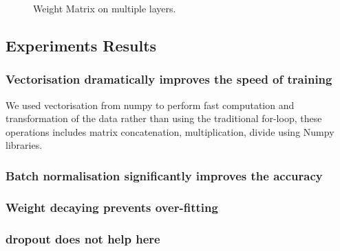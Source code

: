\begin{figure}
    \caption{\label{fig:my-label3}Weight Matrix on multiple layers.}
\end{figure}


\subsection{Experiments Results}

\subsubsection{Vectorisation dramatically improves the speed of training}
We used vectorisation from numpy to perform fast computation and transformation of the data rather than using the traditional for-loop,
these operations includes matrix concatenation, multiplication, divide using Numpy libraries.

\subsubsection{Batch normalisation significantly improves the accuracy}


\subsubsection{Weight decaying prevents over-fitting}


\subsubsection{dropout does not help here}
